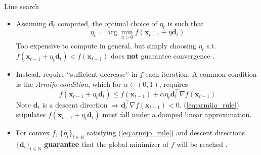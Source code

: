 \documentclass{beamer}
\numberwithin{equation}{section}
\newcommand{\aref}[1]{\alert{\ref{#1}}}
\begin{document}
\begin{frame}{Line search}
    \begin{itemize}
        \item
        Assuming $ \mathbf{d}_t $ computed, the optimal choice of $ \eta_t $
        is such that
        \begin{equation} \label{eq:exact_line_search}
            \eta_t = \arg\min_{\eta > 0}
            f(\mathbf{x}_{t - 1} + \eta\mathbf{d}_t)
        \end{equation}
        Too expensive to compute in general, but simply choosing $ \eta_t $
        s.t. $ f(\mathbf{x}_{t - 1} + \eta_t\mathbf{d}_t) <
        f(\mathbf{x}_{t - 1}) $ does \textbf{not} guarantee convergence
        \cite{nocedal_opt}.

        \item
        Instead, require ``sufficient decrease'' in $ f $ each iteration.
        A common condition is the \textit{Armijo condition}, which for
        $ \alpha \in (0, 1) $, requires
        \begin{equation} \label{eq:armijo_rule}
            f(\mathbf{x}_{t - 1} + \eta_t\mathbf{d}_t) \le
            f(\mathbf{x}_{t - 1}) + \alpha\eta_t\mathbf{d}_t^\top
            \nabla f(\mathbf{x}_{t - 1})
        \end{equation}
        Note $ \mathbf{d}_t $ is a descent direction $ \Rightarrow
        \mathbf{d}_t^\top\nabla f(\mathbf{x}_{t - 1}) < 0 $.
        (\aref{eq:armijo_rule}) stipulates $ f(\mathbf{x}_{t - 1} +
        \eta_t\mathbf{d}_t) $ must fall under a damped linear approximation.

        \item
        For convex $ f $, $ \{\eta_t\}_{t \in \mathbb{N}} $ satisfying
        (\aref{eq:armijo_rule}) and descent directions
        $ \{\mathbf{d}_t\}_{t \in \mathbb{N}} $ \textbf{guarantee} that the
        global minimizer of $ f $ will be reached \cite{stat_learn_sparsity}.
    \end{itemize}
\end{frame}

\end{document}
